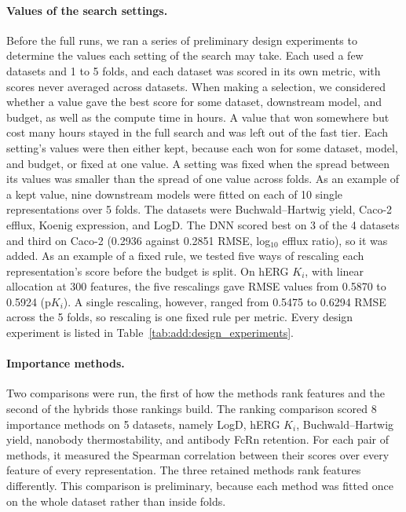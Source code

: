 \paragraph{Values of the search settings.}
Before the full runs, we ran a series of preliminary design experiments to determine the values each setting of the search may take. Each used a few datasets and 1 to 5 folds, and each dataset was scored in its own metric, with scores never averaged across datasets. When making a selection, we considered whether a value gave the best score for some dataset, downstream model, and budget, as well as the compute time in hours. A value that won somewhere but cost many hours stayed in the full search and was left out of the fast tier. Each setting's values were then either kept, because each won for some dataset, model, and budget, or fixed at one value. A setting was fixed when the spread between its values was smaller than the spread of one value across folds. As an example of a kept value, nine downstream models were fitted on each of 10 single representations over 5 folds. The datasets were Buchwald--Hartwig yield, Caco-2 efflux, Koenig expression, and LogD. The DNN scored best on 3 of the 4 datasets and third on Caco-2 (0.2936 against 0.2851 RMSE, log$_{10}$ efflux ratio), so it was added. As an example of a fixed rule, we tested five ways of rescaling each representation's score before the budget is split. On hERG $K_i$, with linear allocation at 300 features, the five rescalings gave RMSE values from 0.5870 to 0.5924 (p$K_i$). A single rescaling, however, ranged from 0.5475 to 0.6294 RMSE across the 5 folds, so rescaling is one fixed rule per metric. Every design experiment is listed in Table~\ref{tab:add:design_experiments}.

\paragraph{Importance methods.}
Two comparisons were run, the first of how the methods rank features and the second of the hybrids those rankings build. The ranking comparison scored 8 importance methods on 5 datasets, namely LogD, hERG $K_i$, Buchwald--Hartwig yield, nanobody thermostability, and antibody FcRn retention. For each pair of methods, it measured the Spearman correlation between their scores over every feature of every representation. The three retained methods rank features differently. This comparison is preliminary, because each method was fitted once on the whole dataset rather than inside folds.


